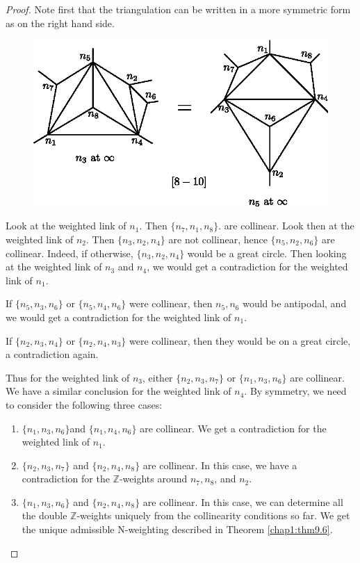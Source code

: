 \begin{proof}
Note first that the triangulation can be written in a more symmetric 
form as on the right hand side. 
\begin{figure}[H]
\centering 
\includegraphics{vol58-fig/fig58-52.eps} 
\end{figure}\pageoriginale


Look at the weighted link of $n_1$. Then $\{ n_7, n_1, n_8 \}$. are
collinear.  Look then at the weighted link of $n_2$. Then $\{ n_3,
n_2, n_4 \}$ are not collinear, hence $\{ n_5, n_2, n_6 \}$ are
collinear. Indeed, if otherwise, $\{ n_3, n_2, n_4 \}$ would be a
great circle. Then looking at the weighted link of $n_3$ and $n_4$, we
would get a contradiction for the weighted link of $n_1$. 

If $\{ n_5, n_3, n_6 \}$ or $\{ n_5, n_4, n_6 \}$ were collinear, then
$n_5, n_6$ would be antipodal, and we would get a contradiction for
the weighted link of $n_1$. 

If $\{ n_2, n_3, n_4 \}$ or $\{ n_2, n_4, n_3 \}$ were collinear, then
they would be on a great circle, a contradiction again. 

Thus for the weighted link of $n_3$, either $\{ n_2, n_3, n_7 \}$ or
$\{ n_1, n_3, n_6 \}$ are collinear. We have a similar conclusion for
the weighted link of $n_4$. By symmetry, we need to consider the
following three cases: 
\begin{enumerate}
\item $\{ n_1, n_3, n_6 \}$\pageoriginale and $\{ n_1, n_4, n_6 \}$
  are collinear. We get a contradiction for the weighted link of
  $n_1$.    

\item $\{ n_2, n_3, n_7 \}$ and $\{ n_2, n_4, n_8 \}$ are collinear.
  In this case, we have a contradiction for the $\mathbb{Z}$-weights
  around $n_7, n_8$, and $n_2$. 

\item $\{ n_1, n_3, n_6 \}$ and $\{ n_2, n_4, n_8 \}$ are collinear.
  In this case, we can determine all the double $\mathbb{Z}$-weights
  uniquely from the collinearity conditions so far. We get the unique
  admissible N-weighting described in Theorem \ref{chap1:thm9.6}. 
\end{enumerate}
\end{proof}

